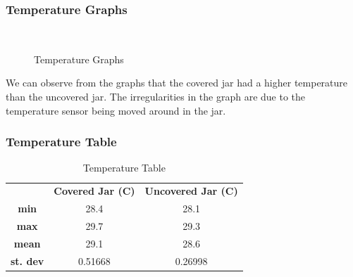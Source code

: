 \documentclass[a4paper, 12pt, english]{article}
\begin{document}
\subsubsection{Temperature Graphs}
\begin{figure}[H]
	\centering
	\\
	\qquad
	\qquad
	\caption{Temperature Graphs}
	\label{fig:TempGraphs}
\end{figure}

We can observe from the graphs that the covered jar had a higher temperature
than the uncovered jar. The irregularities in the graph are due to the
temperature sensor being moved around in the jar.

\subsubsection{Temperature Table}

\begin{table}[H]
	\caption{\label{tab:Table 1} Temperature Table}
	\centering
	\begin{tabular}{c c c}
		\toprule
		                 & \textbf{Covered Jar (\degree C)}
		                 & \textbf{Uncovered Jar (\degree C)}           \\
		\cmidrule[0.4pt](r{0.125em}){1-1}%
		\cmidrule[0.4pt](lr{0.125em}){2-2}%
		\cmidrule[0.4pt](lr{0.125em}){3-3}%
		\textbf{min}     & 28.4                               & 28.1    \\
		\textbf{max}     & 29.7                               & 29.3    \\
		\textbf{mean}    & 29.1                               & 28.6    \\
		\textbf{st. dev} & 0.51668                            & 0.26998
	\end{tabular}
\end{table}
\end{document}

